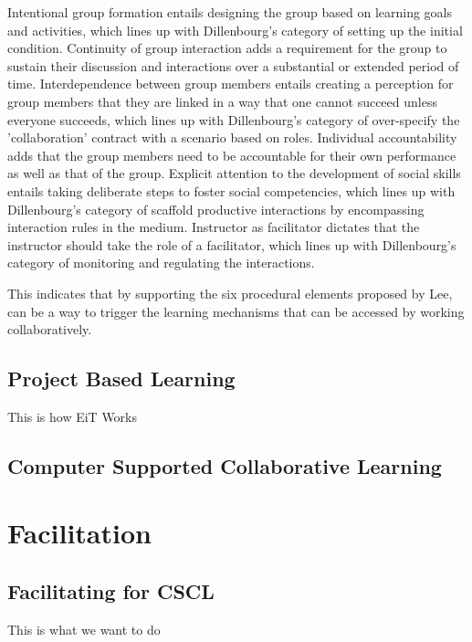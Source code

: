         Intentional group formation entails designing the group based on learning goals and activities, which lines up with Dillenbourg's category of setting up the initial condition. Continuity of group interaction adds a requirement for the group to sustain their discussion and interactions over a substantial or extended period of time. Interdependence between group members entails creating a perception for group members that they are linked in a way that one cannot succeed unless everyone succeeds, which lines up with Dillenbourg's category of over-specify the 'collaboration' contract with a scenario based on roles. Individual accountability adds that the group members need to be accountable for their own performance as well as that of the group. Explicit attention to the development of social skills entails taking deliberate steps to foster social competencies, which lines up with Dillenbourg's category of scaffold productive interactions by encompassing interaction rules in the medium. Instructor as facilitator dictates that the instructor should take the role of a facilitator, which lines up with Dillenbourg's category of monitoring and regulating the interactions.
        
        This indicates that by supporting the six procedural elements proposed by Lee, can be a way to trigger the learning mechanisms that can be accessed by working collaboratively.

        \subsection{Project Based Learning}
        This is how EiT Works
        
        \subsection{Computer Supported Collaborative Learning}
    
    \section{Facilitation}
        \subsection{Facilitating for CSCL}
        This is what we want to do